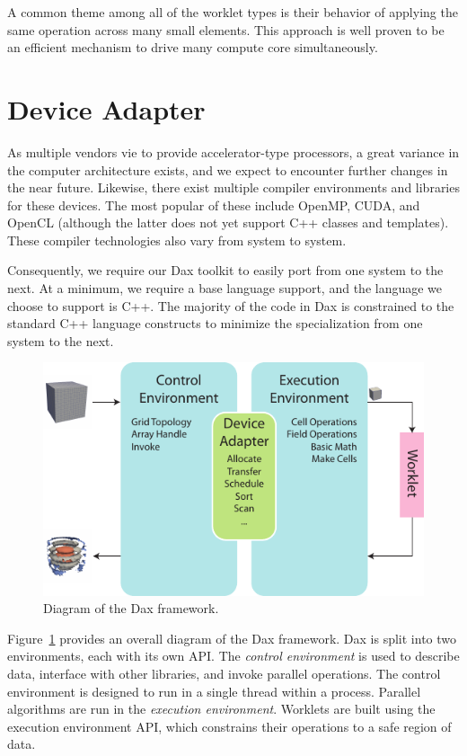 \documentclass[conference]{IEEEtran}
\newcommand*{\keyterm}[1]{\emph{#1}}
\begin{document}
A common theme among all of the worklet types is their behavior of applying
the same operation across many small elements.  This approach is well
proven to be an efficient mechanism to drive many compute core
simultaneously.

\section{Device Adapter}
\label{sec:DeviceAdapter}

\noindent
As multiple vendors vie to provide accelerator-type processors, a great
variance in the computer architecture exists, and we expect to encounter
further changes in the near future.  Likewise, there exist multiple
compiler environments and libraries for these devices.  The most popular of
these include OpenMP, CUDA, and OpenCL (although the latter does not yet
support C++ classes and templates).  These compiler technologies also vary
from system to system.

Consequently, we require our Dax toolkit to easily port from one system to
the next.  At a minimum, we require a base language support, and the
language we choose to support is C++.  The majority of the code in Dax is
constrained to the standard C++ language constructs to minimize the
specialization from one system to the next.

\begin{figure}[htb]
  \centering
  \includegraphics[width=\linewidth]{images/DaxDiagram}
  \caption{Diagram of the Dax framework.}
  \label{fig:DaxDiagram}
\end{figure}

Figure~\ref{fig:DaxDiagram} provides an overall diagram of the Dax
framework.  Dax is split into two environments, each with its own API.  The
\keyterm{control environment} is used to describe data, interface with
other libraries, and invoke parallel operations.  The control environment
is designed to run in a single thread within a process.  Parallel
algorithms are run in the \keyterm{execution environment}.  Worklets are
built using the execution environment API, which constrains their
operations to a safe region of data.
\end{document}
